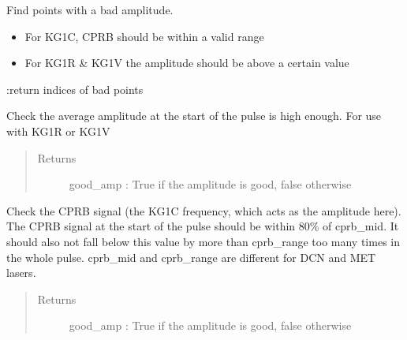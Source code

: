 \documentclass[letterpaper,10pt,english]{sphinxmanual}
\begin{document}
\begin{fulllineitems}
\begin{fulllineitems}
\begin{quote}
\begin{description}
\end{description}\end{quote}

\end{fulllineitems}


\begin{fulllineitems}
\label{signal_amp:signal_amp.SignalAmp.find_bad_points}
Find points with a bad amplitude.
\begin{itemize}
\item {} 
For KG1C, CPRB should be within a valid range

\item {} 
For KG1R \& KG1V the amplitude should be above a certain value

\end{itemize}

:return indices of bad points

\end{fulllineitems}


\begin{fulllineitems}
\label{signal_amp:signal_amp.SignalAmp._check_amp_average}
Check the average amplitude at the start of the pulse is high enough.
For use with KG1R or KG1V
\begin{quote}\begin{description}
\item[{Returns}] \leavevmode
good\_amp : True if the amplitude is good, false otherwise

\end{description}\end{quote}

\end{fulllineitems}


\begin{fulllineitems}
\label{signal_amp:signal_amp.SignalAmp._check_amp_kg1c}
Check the CPRB signal (the KG1C frequency, which acts as the amplitude here).
The CPRB signal at the start of the pulse should be within 80\% of cprb\_mid.
It should also not fall below this value by more than cprb\_range too many times
in the whole pulse.
cprb\_mid and cprb\_range are different for DCN and MET lasers.
\begin{quote}\begin{description}
\item[{Returns}] \leavevmode
good\_amp : True if the amplitude is good, false otherwise


\end{description}
\end{quote}
\end{fulllineitems}
\end{fulllineitems}
\end{document}
